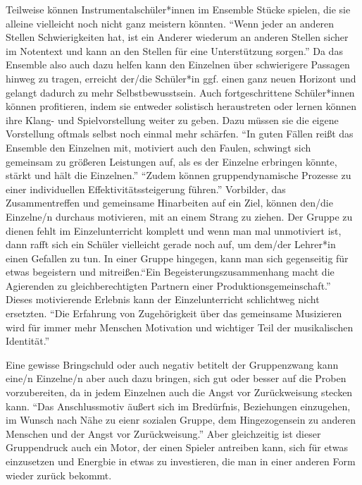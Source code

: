 Teilweise können Instrumentalschüler*innen im Ensemble Stücke spielen, die sie
alleine vielleicht noch nicht ganz meistern könnten. \enquote{Wenn jeder an
anderen Stellen Schwierigkeiten hat, ist ein Anderer wiederum an anderen Stellen
sicher im Notentext und kann an den Stellen für eine Unterstützung sorgen.}
\autocite[32]{losert:die_kunst_zu_unterrichten}
Da das Ensemble also auch dazu helfen kann den Einzelnen über schwierigere
Passagen hinweg zu tragen, erreicht der/die Schüler*in ggf. einen ganz neuen
Horizont und gelangt dadurch zu mehr Selbstbewusstsein. Auch fortgeschrittene
Schüler*innen können profitieren, indem sie entweder solistisch heraustreten
oder lernen können ihre Klang- und Spielvorstellung weiter zu geben. Dazu müssen
sie die eigene Vorstellung oftmals selbst noch einmal mehr schärfen. \enquote{In
guten Fällen reißt das Ensemble den Einzelnen mit, motiviert auch den Faulen,
schwingt sich gemeinsam zu größeren Leistungen auf, als es der Einzelne
erbringen könnte, stärkt und hält die Einzelnen.}
\autocite[94]{mitzscherlich:musikpsychologie} \enquote{Zudem können
gruppendynamische Prozesse zu einer individuellen Effektivitätssteigerung
führen.} \autocite{losert:die_kunst_zu_unterrichten} Vorbilder, das
Zusammentreffen und gemeinsame Hinarbeiten auf ein Ziel, können den/die
Einzelne/n durchaus motivieren, mit an einem Strang zu ziehen. Der Gruppe zu
dienen fehlt im Einzelunterricht komplett und wenn man mal unmotiviert ist, dann
rafft sich ein Schüler vielleicht gerade noch auf, um dem/der Lehrer*in einen
Gefallen zu tun. In einer Gruppe hingegen, kann man sich gegenseitig für etwas
begeistern und mitreißen.\enquote{Ein Begeisterungszusammenhang macht die
Agierenden zu gleichberechtigten Partnern einer Produktionsgemeinschaft.}
\autocite[198]{busch:grundwissen_instrumentalpaedagogik} Dieses motivierende
Erlebnis kann der Einzelunterricht schlichtweg nicht ersetzten. \enquote{Die
Erfahrung von Zugehörigkeit über das gemeinsame Musizieren wird für immer mehr
Menschen Motivation und wichtiger Teil der musikalischen Identität.}
\autocite[123]{mitzscherlich:musikpsychologie}

Eine gewisse Bringschuld oder auch negativ betitelt der Gruppenzwang kann eine/n
Einzelne/n aber auch dazu bringen, sich gut oder besser auf die Proben
vorzubereiten, da in jedem Einzelnen auch die Angst vor Zurückweisung stecken
kann. \enquote{Das Anschlussmotiv äußert sich im Bredürfnis, Beziehungen
einzugehen, im Wunsch nach Nähe zu eienr sozialen Gruppe, dem Hingezogensein zu
anderen Menschen und der Angst vor Zurückweisung.}
\autocite[120ff]{losert:die_kunst_zu_unterrichten} Aber gleichzeitig ist dieser
Gruppendruck auch ein Motor, der einen Spieler antreiben kann, sich für etwas
einzusetzen und Energbie in etwas zu investieren, die man in einer anderen Form
wieder zurück bekommt.






